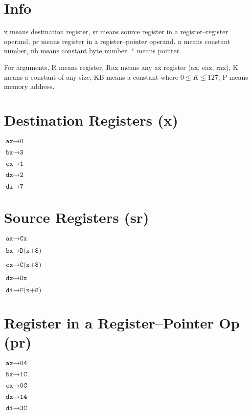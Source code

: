 \documentclass{article}
\begin{document}
\section*{Info}

x means destination register, sr means source register in a register--register
operand, pr means register in a register--pointer operand. n means constant
number, nb means constant byte number. * means pointer.

For arguments, R means register, Rax means any ax register (ax, eax, rax),
K means a constant of any size, KB means a constant where $0 \leq K \leq 127$,
P means memory address.

\section*{Destination Registers (x)}
\begin{minipage}{\textwidth}

$\texttt{ax} \rightarrow \texttt{0}$

$\texttt{bx} \rightarrow \texttt{3}$

$\texttt{cx} \rightarrow \texttt{1}$

$\texttt{dx} \rightarrow \texttt{2}$

$\texttt{di} \rightarrow \texttt{7}$

\end{minipage}


\section*{Source Registers (sr)}
\begin{minipage}{\textwidth}

$\texttt{ax} \rightarrow \texttt{Cx}$

$\texttt{bx} \rightarrow \texttt{D(x+8)}$

$\texttt{cx} \rightarrow \texttt{C(x+8)}$

$\texttt{dx} \rightarrow \texttt{Dx}$

$\texttt{di} \rightarrow \texttt{F(x+8)}$

\end{minipage}


\section*{Register in a Register--Pointer Op (pr)}
\begin{minipage}{\textwidth}

$\texttt{ax} \rightarrow \texttt{04}$

$\texttt{bx} \rightarrow \texttt{1C}$

$\texttt{cx} \rightarrow \texttt{0C}$

$\texttt{dx} \rightarrow \texttt{14}$

$\texttt{di} \rightarrow \texttt{3C}$

\end{minipage}
\end{document}
